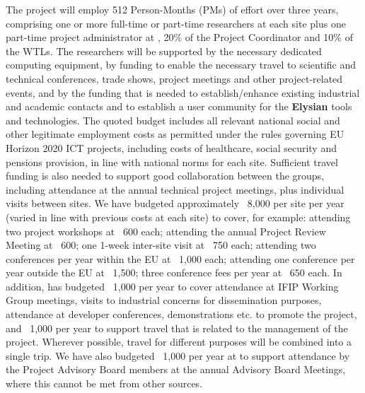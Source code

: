 \documentclass[a4paper,11pt]{article}
\newcommand{\project}[1]{\textbf{#1}\xspace}
\newcommand{\SECURITY}{\project{Elysian}}
\newcommand{\TheProject}{\SECURITY}
\begin{document}
The project will employ 512 Person-Months (PMs) of effort over three
years, comprising one or more full-time or part-time researchers at each site
plus one part-time project administrator at \SAshort{}, %
20\% of the Project Coordinator and 10\% of the WTLs. The researchers will be supported by
the necessary dedicated computing equipment,
by funding to enable the necessary travel to scientific and technical conferences, trade shows, 
project meetings and other project-related events, and by the funding that is needed to establish/enhance existing
industrial and academic contacts and to establish a user
community for the \TheProject{} tools and technologies.
%
The quoted budget includes all relevant national social and
other legitimate employment costs as permitted under the rules
governing EU Horizon 2020 ICT projects, including costs of
healthcare, social security and pensions provision, in line with national norms for each site.
%
Sufficient travel funding is also needed to support good
collaboration between the groups, including attendance at the
annual technical project meetings, plus individual visits between
sites. We have budgeted approximately \euros{}~8,000 per
site per year (varied in line with previous
costs at each site)  to cover, for example:
attending two project workshops at \euros{}~600 each;
attending the annual Project Review Meeting at \euros{}~600;
one 1-week inter-site visit at \euros{}~750 each;
attending two conferences per year within the EU at \euros{}~1,000 each;
attending one conference per year outside the EU at \euros{}~1,500;
three conference fees per year at \euros{}~650 each.
%
\noindent
In addition, \SAshort{} has budgeted \euros{}~1,000 per year to cover attendance at
IFIP Working Group meetings, visits to industrial concerns for dissemination purposes,
attendance at developer conferences, demonstrations etc. to promote the project,
and \euros~1,000 per year to support travel that is related to the management of the
project.
Wherever possible, travel for different purposes will be
combined into a single trip. We have also budgeted \euros~1,000
per year at \SAshort{} to support attendance by the Project Advisory Board members at
the annual Advisory Board Meetings, where this cannot be met from other sources.
\end{document}
